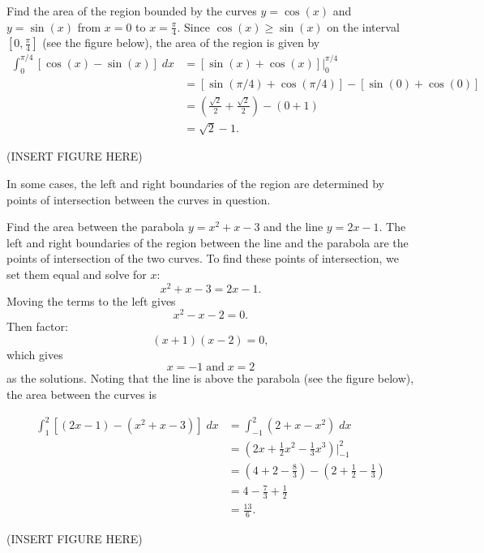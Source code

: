 \documentclass{ximera}
\begin{document}
\begin{example}
Find the area of the region bounded by the curves $y = \cos(x)$ and $y = \sin(x)$ from $x = 0$ to $x = \frac{\pi}{4}$.
Since $\cos(x) \geq \sin(x)$ on the interval $\left[0, \frac{\pi}{4}\right]$ (see the figure below), the area of the region is given by
\begin{align*}
\int_0^{\pi/4} [\cos(x) - \sin(x)] \; dx &= [\sin(x) + \cos(x)]\Big|_0^{\pi/4} \\
                                         &= [\sin(\pi/4) + \cos(\pi/4)] - [\sin(0) + \cos(0)]\\
                                          &= \left(\tfrac{\sqrt 2}{2} + \tfrac{\sqrt 2}{2} \right) - (0 + 1) \\
                                         &= \sqrt 2 - 1.
\end{align*}

(INSERT FIGURE HERE)

\end{example}
                                         

In some cases, the left and right boundaries of the region are determined by points of intersection between the curves in question.

\begin{example}
Find the area between the parabola $y = x^2 + x - 3$ and the line $y = 2x - 1$. The left and right boundaries of the region between the line and the parabola are 
the points of intersection of the two curves. To find these points of intersection, we set them equal and solve for $x$:
\[
x^2 + x - 3 = 2x-1.
\]
Moving the terms to the left gives
\[
 x^2 -x -2 = 0.
 \]
 Then factor:
 \[
  (x+1)(x-2) = 0,
  \]
  which gives
  \[
   x = -1 \;\text{and}\; x= 2
   \]
   as the solutions.
Noting that the line is above the parabola (see the figure below), the area between the curves is 

\begin{align*}
\int_1^2 \left[(2x - 1) - (x^2 + x - 3)\right] \; dx &= \int_{-1}^2 \left(2 + x - x^2\right) \; dx \\
                                           &= \left(2x + \frac12 x^2 - \frac13 x^3 \right) \bigg|_{-1}^2 \\
                                           &= \left(4 + 2 - \frac83 \right) - \left(2 + \frac12 - \frac13 \right)\\
                                           &= 4 - \frac73 + \frac12 \\
                                           & = \frac{13}{6}.
\end{align*}

(INSERT FIGURE HERE)

\end{example}
\end{document}
